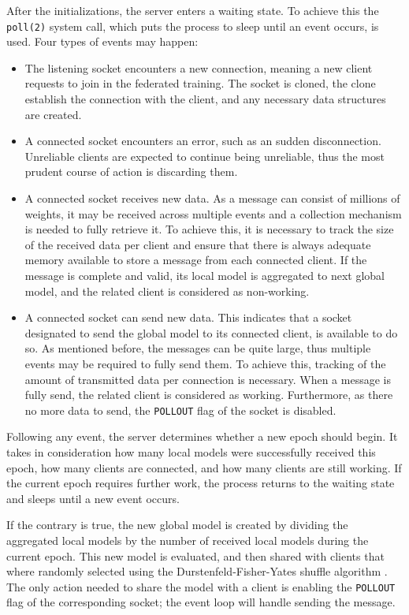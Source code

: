 After the initializations, the server enters a waiting state. To achieve this the \texttt{poll(2)} system call, which puts the process to sleep until an event occurs, is used. Four types of events may happen:
\begin{itemize}[leftmargin=*]
    \item The listening socket encounters a new connection, meaning a new client requests to join in the federated training. The socket is cloned, the clone establish the connection with the client, and any necessary data structures are created.
    \item A connected socket encounters an error, such as an sudden disconnection. Unreliable clients are expected to continue being unreliable, thus the most prudent course of action is discarding them.
    \item A connected socket receives new data. As a message can consist of millions of weights, it may be received across multiple events and a collection mechanism is needed to fully retrieve it. To achieve this, it is necessary to track the size of the received data per client and ensure that there is always adequate memory available to store a message from each connected client. If the message is complete and valid, its local model is aggregated to next global model, and the related client is considered as non-working.
    \item A connected socket can send new data. This indicates that a socket designated to send the global model to its connected client, is available to do so. As mentioned before, the messages can be quite large, thus multiple events may be required to fully send them. To achieve this, tracking of the amount of transmitted data per connection is necessary. When a message is fully send, the related client is considered as working. Furthermore, as there no more data to send, the \texttt{POLLOUT} flag of the socket is disabled.
\end{itemize}

Following any event, the server determines whether a new epoch should begin. It takes in consideration how many local models were successfully received this epoch, how many clients are connected, and how many clients are still working. If the current epoch requires further work, the process returns to the waiting state and sleeps until a new event occurs.

If the contrary is true, the new global model is created by dividing the aggregated local models by the number of received local models during the current epoch. This new model is evaluated, and then shared with clients that where randomly selected using the Durstenfeld-Fisher-Yates shuffle algorithm \cite{Durstenfeld_Fisher_Yates_paper, Fisher_Yates_shuffle_wiki}. The only action needed to share the model with a client is enabling the \texttt{POLLOUT} flag of the corresponding socket; the event loop will handle sending the message.

